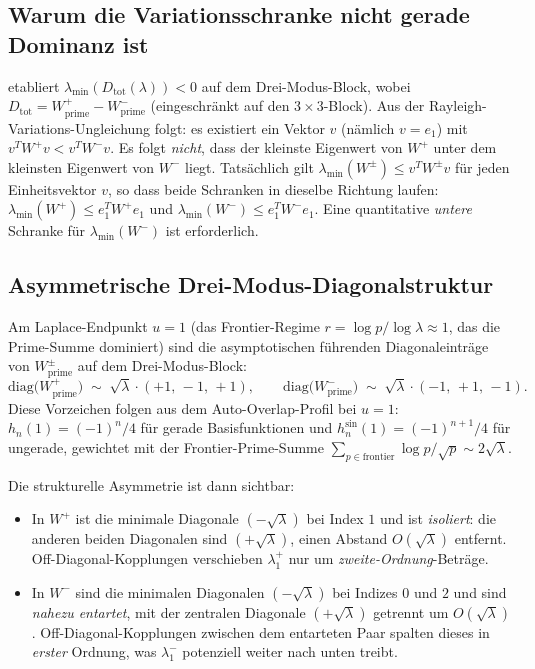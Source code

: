 \documentclass[11pt,a4paper]{article}
\theoremstyle{remark}
\theoremstyle{plain}
\begin{document}
\subsection{Warum die Variationsschranke nicht gerade Dominanz ist}

 etabliert $\lambda_{\min}(D_{\mathrm{tot}}(\lambda))<0$ auf dem Drei-Modus-Block, wobei $D_{\mathrm{tot}}=W^+_{\mathrm{prime}}-W^-_{\mathrm{prime}}$ (eingeschränkt auf den $3\times 3$-Block). Aus der Rayleigh-Variations-Ungleichung folgt: es existiert ein Vektor $v$ (nämlich $v=e_1$) mit $v^TW^+v<v^TW^-v$. Es folgt \emph{nicht}, dass der kleinste Eigenwert von $W^+$ unter dem kleinsten Eigenwert von $W^-$ liegt. Tatsächlich gilt $\lambda_{\min}(W^\pm)\leq v^TW^\pm v$ für jeden Einheitsvektor $v$, so dass beide Schranken in dieselbe Richtung laufen: $\lambda_{\min}(W^+)\leq e_1^TW^+e_1$ und $\lambda_{\min}(W^-)\leq e_1^TW^-e_1$. Eine quantitative \emph{untere} Schranke für $\lambda_{\min}(W^-)$ ist erforderlich.

\subsection{Asymmetrische Drei-Modus-Diagonalstruktur}

Am Laplace-Endpunkt $u=1$ (das Frontier-Regime $r=\log p/\log\lambda\approx 1$, das die Prime-Summe dominiert) sind die asymptotischen führenden Diagonaleinträge von $W^\pm_{\mathrm{prime}}$ auf dem Drei-Modus-Block:
\[
  \mathrm{diag}\bigl(W^+_{\mathrm{prime}}\bigr) \;\sim\; \sqrt\lambda\cdot(+1,\,-1,\,+1),
  \qquad
  \mathrm{diag}\bigl(W^-_{\mathrm{prime}}\bigr) \;\sim\; \sqrt\lambda\cdot(-1,\,+1,\,-1).
\]
Diese Vorzeichen folgen aus dem Auto-Overlap-Profil bei $u=1$: $h_n(1)=(-1)^n/4$ für gerade Basisfunktionen und $h_n^{\sin}(1)=(-1)^{n+1}/4$ für ungerade, gewichtet mit der Frontier-Prime-Summe $\sum_{p\in\text{frontier}}\log p/\sqrt p\sim 2\sqrt\lambda$.

Die strukturelle Asymmetrie ist dann sichtbar:
\begin{itemize}[leftmargin=*]
  \item In $W^+$ ist die minimale Diagonale $(-\sqrt\lambda)$ bei Index $1$ und ist \emph{isoliert}: die anderen beiden Diagonalen sind $(+\sqrt\lambda)$, einen Abstand $O(\sqrt\lambda)$ entfernt. Off-Diagonal-Kopplungen verschieben $\lambda_1^+$ nur um \emph{zweite-Ordnung}-Beträge.
  \item In $W^-$ sind die minimalen Diagonalen $(-\sqrt\lambda)$ bei Indizes $0$ und $2$ und sind \emph{nahezu entartet}, mit der zentralen Diagonale $(+\sqrt\lambda)$ getrennt um $O(\sqrt\lambda)$. Off-Diagonal-Kopplungen zwischen dem entarteten Paar spalten dieses in \emph{erster} Ordnung, was $\lambda_1^-$ potenziell weiter nach unten treibt.
\end{itemize}
\end{document}
